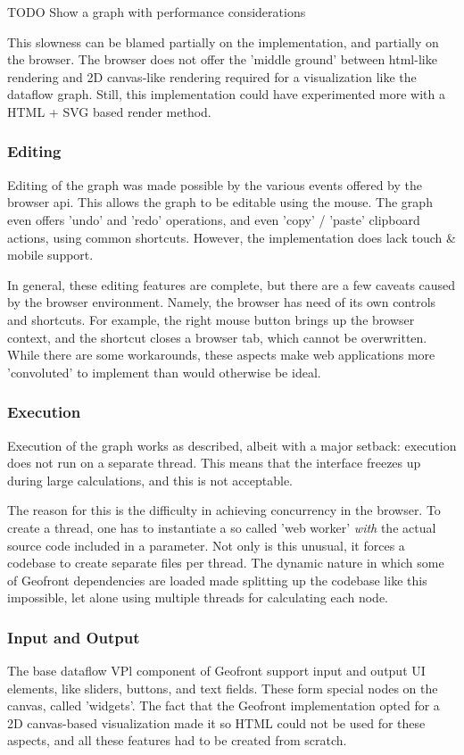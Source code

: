 \begin{note}
  TODO Show a graph with performance considerations
\end{note}

This slowness can be blamed partially on the implementation, and partially on the browser. 
The browser does not offer the 'middle ground' between html-like rendering and 2D canvas-like rendering required for a visualization like the dataflow graph. 
Still, this implementation could have experimented more with a HTML + SVG based render method.

\subsubsection*{Editing}
Editing of the graph was made possible by the various events offered by the browser api. 
This allows the graph to be editable using the mouse. 
The graph even offers 'undo' and 'redo' operations, and even 'copy' / 'paste' clipboard actions, using common shortcuts. 
However, the implementation does lack touch \& mobile support.

In general, these editing features are complete, but there are a few caveats caused by the browser environment.
Namely, the browser has need of its own controls and shortcuts. 
For example, the right mouse button brings up the browser context, and the  shortcut closes a browser tab, which cannot be overwritten.
While there are some workarounds, these aspects make web applications more 'convoluted' to implement than would otherwise be ideal.

\subsubsection*{Execution}
Execution of the graph works as described, albeit with a major setback: execution does not run on a separate thread. 
This means that the interface freezes up during large calculations, and this is not acceptable. 

The reason for this is the difficulty in achieving concurrency in the browser. 
To create a thread, one has to instantiate a so called 'web worker' \emph{with} the actual source code included in a parameter. 
Not only is this unusual, it forces a codebase to create separate files per thread.
The dynamic nature in which some of Geofront dependencies are loaded made splitting up the codebase like this impossible, let alone using multiple threads for calculating each node.

\subsubsection*{Input and Output}
The base dataflow VPl component of Geofront support input and output UI elements, like sliders, buttons, and text fields.
These form special nodes on the canvas, called 'widgets'. 
The fact that the Geofront implementation opted for a 2D canvas-based visualization made it so HTML could not be used for these aspects, and all these features had to be created from scratch.


